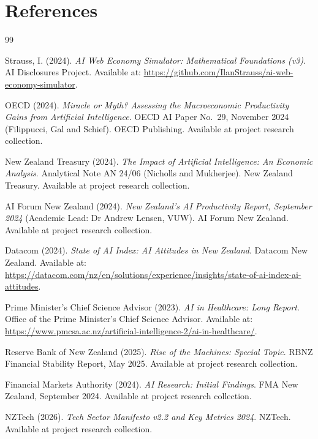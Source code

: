 \documentclass[11pt,a4paper]{article}
\begin{document}
\section{References}

\begin{thebibliography}{99}

Strauss, I. (2024). \textit{AI Web Economy Simulator: Mathematical Foundations (v3)}. AI Disclosures Project. Available at: \url{https://github.com/IlanStrauss/ai-web-economy-simulator}.

OECD (2024). \textit{Miracle or Myth? Assessing the Macroeconomic Productivity Gains from Artificial Intelligence}. OECD AI Paper No.\ 29, November 2024 (Filippucci, Gal and Schief). OECD Publishing. Available at project research collection.

New Zealand Treasury (2024). \textit{The Impact of Artificial Intelligence: An Economic Analysis}. Analytical Note AN 24/06 (Nicholls and Mukherjee). New Zealand Treasury. Available at project research collection.

AI Forum New Zealand (2024). \textit{New Zealand's AI Productivity Report, September 2024} (Academic Lead: Dr Andrew Lensen, VUW). AI Forum New Zealand. Available at project research collection.

Datacom (2024). \textit{State of AI Index: AI Attitudes in New Zealand}. Datacom New Zealand. Available at: \url{https://datacom.com/nz/en/solutions/experience/insights/state-of-ai-index-ai-attitudes}.

Prime Minister's Chief Science Advisor (2023). \textit{AI in Healthcare: Long Report}. Office of the Prime Minister's Chief Science Advisor. Available at: \url{https://www.pmcsa.ac.nz/artificial-intelligence-2/ai-in-healthcare/}.

Reserve Bank of New Zealand (2025). \textit{Rise of the Machines: Special Topic}. RBNZ Financial Stability Report, May 2025. Available at project research collection.

Financial Markets Authority (2024). \textit{AI Research: Initial Findings}. FMA New Zealand, September 2024. Available at project research collection.

NZTech (2026). \textit{Tech Sector Manifesto v2.2 and Key Metrics 2024}. NZTech. Available at project research collection.


\end{thebibliography}
\end{document}
